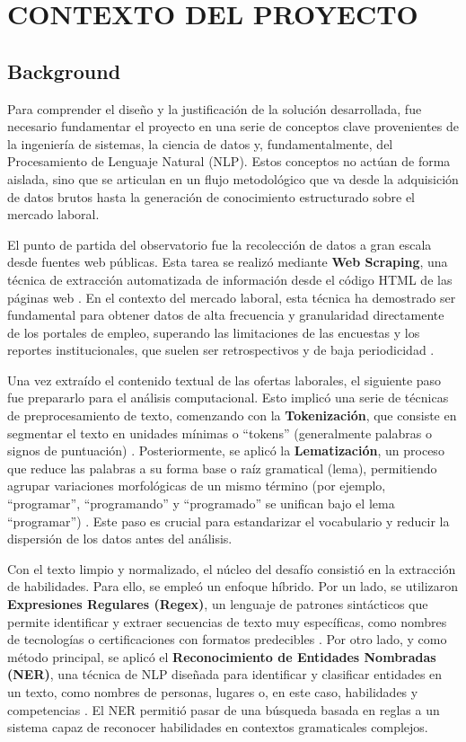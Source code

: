 \chapter{CONTEXTO DEL PROYECTO}

\section{Background}

Para comprender el diseño y la justificación de la solución desarrollada, fue necesario fundamentar el proyecto en una serie de conceptos clave provenientes de la ingeniería de sistemas, la ciencia de datos y, fundamentalmente, del Procesamiento de Lenguaje Natural (NLP). Estos conceptos no actúan de forma aislada, sino que se articulan en un flujo metodológico que va desde la adquisición de datos brutos hasta la generación de conocimiento estructurado sobre el mercado laboral.

El punto de partida del observatorio fue la recolección de datos a gran escala desde fuentes web públicas. Esta tarea se realizó mediante \textbf{Web Scraping}, una técnica de extracción automatizada de información desde el código HTML de las páginas web \cite{orozco2019}. En el contexto del mercado laboral, esta técnica ha demostrado ser fundamental para obtener datos de alta frecuencia y granularidad directamente de los portales de empleo, superando las limitaciones de las encuestas y los reportes institucionales, que suelen ser retrospectivos y de baja periodicidad \cite{cardenas2015, rubio2024}.

Una vez extraído el contenido textual de las ofertas laborales, el siguiente paso fue prepararlo para el análisis computacional. Esto implicó una serie de técnicas de preprocesamiento de texto, comenzando con la \textbf{Tokenización}, que consiste en segmentar el texto en unidades mínimas o ``tokens'' (generalmente palabras o signos de puntuación) \cite{nguyen2024}. Posteriormente, se aplicó la \textbf{Lematización}, un proceso que reduce las palabras a su forma base o raíz gramatical (lema), permitiendo agrupar variaciones morfológicas de un mismo término (por ejemplo, ``programar'', ``programando'' y ``programado'' se unifican bajo el lema ``programar'') \cite{echeverria2022}. Este paso es crucial para estandarizar el vocabulario y reducir la dispersión de los datos antes del análisis.

Con el texto limpio y normalizado, el núcleo del desafío consistió en la extracción de habilidades. Para ello, se empleó un enfoque híbrido. Por un lado, se utilizaron \textbf{Expresiones Regulares (Regex)}, un lenguaje de patrones sintácticos que permite identificar y extraer secuencias de texto muy específicas, como nombres de tecnologías o certificaciones con formatos predecibles \cite{lukauskas2023}. Por otro lado, y como método principal, se aplicó el \textbf{Reconocimiento de Entidades Nombradas (NER)}, una técnica de NLP diseñada para identificar y clasificar entidades en un texto, como nombres de personas, lugares o, en este caso, habilidades y competencias \cite{herandi2024}. El NER permitió pasar de una búsqueda basada en reglas a un sistema capaz de reconocer habilidades en contextos gramaticales complejos.

